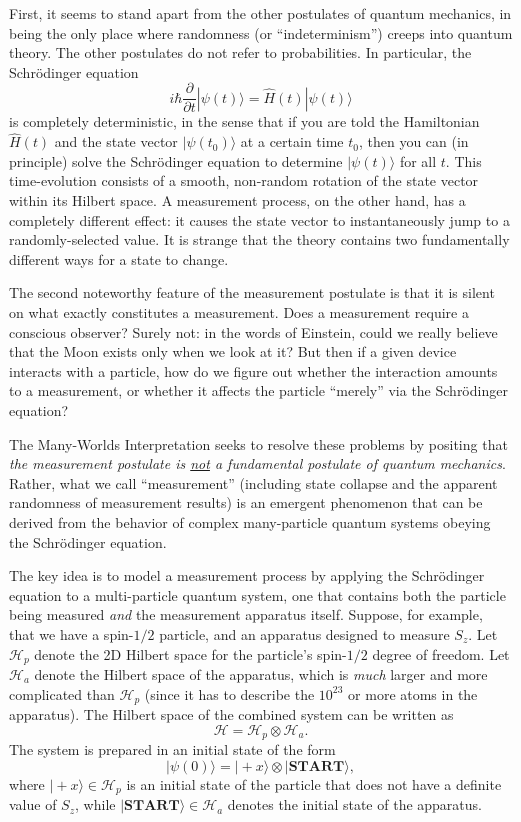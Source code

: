 \documentclass[pra,11pt]{revtex4}
\begin{document}
First, it seems to stand apart from the other postulates of quantum
mechanics, in being the only place where randomness (or
``indeterminism'') creeps into quantum theory.  The other postulates
do not refer to probabilities.  In particular, the Schr\"odinger equation
$$i\hbar\frac{\partial}{\partial t}|\psi(t)\rangle = \hat{H}(t) |\psi(t)\rangle$$
is completely deterministic, in the sense that if you are told the
Hamiltonian $\hat{H}(t)$ and the state vector $|\psi(t_0)\rangle$ at a
certain time $t_0$, then you can (in principle) solve the
Schr\"odinger equation to determine $|\psi(t)\rangle$ for all $t$.
This time-evolution consists of a smooth, non-random rotation of the
state vector within its Hilbert space.  A measurement process, on the
other hand, has a completely different effect: it causes the state
vector to instantaneously jump to a randomly-selected value.  It is
strange that the theory contains two fundamentally different ways for a
state to change.

The second noteworthy feature of the measurement postulate is that it
is silent on what exactly constitutes a measurement.  Does a
measurement require a conscious observer?  Surely not: in the words of
Einstein, could we really believe that the Moon exists only when we
look at it?  But then if a given device interacts with a particle, how
do we figure out whether the interaction amounts to a measurement, or
whether it affects the particle ``merely'' via the Schr\"odinger equation?

The Many-Worlds Interpretation seeks to resolve these problems by
positing that \textit{the measurement postulate is \underline{not} a
  fundamental postulate of quantum mechanics}.  Rather, what we call
``measurement'' (including state collapse and the apparent randomness
of measurement results) is an emergent phenomenon that can be derived
from the behavior of complex many-particle quantum systems obeying the
Schr\"odinger equation.

The key idea is to model a measurement process by applying the
Schr\"odinger equation to a multi-particle quantum system, one that
contains both the particle being measured \textit{and} the measurement
apparatus itself.  Suppose, for example, that we have a spin-$1/2$
particle, and an apparatus designed to measure $S_z$.  Let
$\mathscr{H}_p$ denote the 2D Hilbert space for the particle's
spin-$1/2$ degree of freedom.  Let $\mathscr{H}_a$ denote the Hilbert
space of the apparatus, which is \textit{much} larger and more
complicated than $\mathscr{H}_p$ (since it has to describe the
$10^{23}$ or more atoms in the apparatus).  The Hilbert space of the
combined system can be written as
$$\mathscr{H} = \mathscr{H}_p \otimes \mathscr{H}_a.$$
The system is prepared in an initial state of the form
$$|\psi(0)\rangle = |\!+x\rangle \otimes |\textbf{START}\rangle,$$
where $|\!+x\rangle \in \mathscr{H}_p$ is an initial state of the
particle that does not have a definite value of $S_z$, while
$|\textbf{START}\rangle \in \mathscr{H}_a$ denotes the initial state
of the apparatus.
\end{document}
